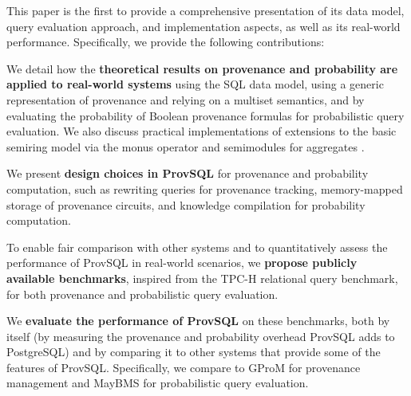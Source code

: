 This paper is the first to provide a comprehensive presentation of its
data model, query evaluation approach, and implementation aspects, as
well as its real-world performance. Specifically, we provide the
following contributions:
\begin{asparaenum}[(i)]
	\item We detail how the \textbf{theoretical results on provenance and
		probability are applied to real-world systems} using the SQL data
	model, using a generic representation of provenance and relying on
	a multiset semantics, and by evaluating the probability of Boolean
  provenance formulas for
	probabilistic
	query evaluation. We also discuss practical implementations of
  extensions to the basic semiring model via the monus operator \cite{dblp:journals/japll/geertsp10} and semimodules for aggregates \cite{amsterdamer2011provenance}.
	\item We present \textbf{design choices in ProvSQL} for provenance and
	probability computation, such as rewriting queries for
	provenance tracking, memory-mapped storage of provenance
	circuits, and knowledge compilation for probability
	computation.
	\item To enable fair comparison with other systems and to
	quantitatively assess the performance of ProvSQL in real-world
	scenarios, we \textbf{propose publicly available benchmarks}, inspired from the TPC-H relational query benchmark, for both provenance and probabilistic query evaluation.
	\item We \textbf{evaluate the performance of ProvSQL} on these benchmarks, both by itself (by measuring the provenance and probability overhead ProvSQL adds to PostgreSQL) and by comparing it to other systems that provide some of the features of ProvSQL. Specifically, we compare to GProM for provenance management and MayBMS for probabilistic query evaluation.
\end{asparaenum}

